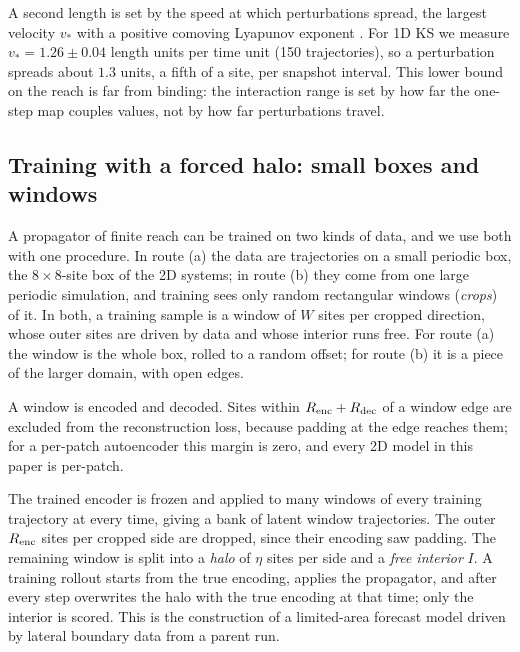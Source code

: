 A second length is set by the speed at which perturbations spread, the
largest velocity $v_*$ with a positive comoving Lyapunov exponent
\citep{kaneko1986,deisslerkaneko1987}. For 1D KS we measure
$v_*=1.26\pm0.04$ length units per time unit (150 trajectories), so a
perturbation spreads about $1.3$ units, a fifth of a site, per snapshot
interval. This lower bound on the reach is far from binding: the
interaction range is set by how far the one-step map couples values, not
by how far perturbations travel.

\subsection{Training with a forced halo: small boxes and windows}
\label{sec:crop_training}

A propagator of finite reach can be trained on two kinds of data, and we
use both with one procedure. In route (a) the data are trajectories on a
small periodic box, the $8\times8$-site box of the 2D systems; in route
(b) they come from one large periodic simulation, and training sees only
random rectangular windows (\emph{crops}) of it. In both, a training
sample is a window of $W$ sites per cropped direction, whose outer sites
are driven by data and whose interior runs free. For route (a) the
window is the whole box, rolled to a random offset; for route (b) it is
a piece of the larger domain, with open edges.

A window is encoded and decoded. Sites within $R_{\mathrm{enc}}+R_{\mathrm{dec}}$ of a window
edge are excluded from the reconstruction loss, because padding at the
edge reaches them; for a per-patch autoencoder this margin is zero, and
every 2D model in this paper is per-patch.

The trained encoder is frozen and applied to many windows of every
training trajectory at every time, giving a bank of latent window
trajectories. The outer $R_{\mathrm{enc}}$ sites per cropped side are dropped, since
their encoding saw padding. The remaining window is split into a
\emph{halo} of $\eta$ sites per side and a \emph{free interior} $I$. A
training rollout starts from the true encoding, applies the propagator,
and after every step overwrites the halo with the true encoding at that
time; only the interior is scored. This is the construction of a
limited-area forecast model driven by lateral boundary data from a
parent run.

